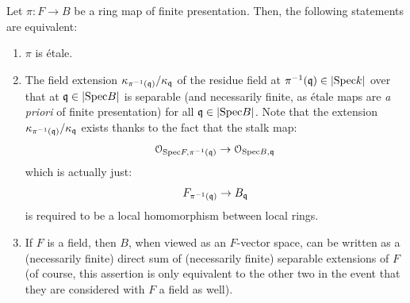             \begin{proposition} \label{prop: separable_criterion_for_etaleness} 
                Let $\pi: F \to B$ be a ring map of finite presentation. Then, the following statements are equivalent:
                    \begin{enumerate}
                        \item $\pi$ is \'etale.
                        \item The field extension $\kappa_{\pi^{-1}(\mathfrak{q})}/\kappa_{\mathfrak{q}}$ of the residue field at $\pi^{-1}(\mathfrak{q}) \in |\mathrm{Spec} k|$ over that at $\mathfrak{q} \in |\mathrm{Spec} B|$ is separable (and necessarily finite, as \'etale maps are \textit{a priori} of finite presentation) for all $\mathfrak{q} \in |\mathrm{Spec} B|$. Note that the extension $\kappa_{\pi^{-1}(\mathfrak{q})}/\kappa_{\mathfrak{q}}$ exists thanks to the fact that the stalk map:
                            $$\mathcal{O}_{\mathrm{Spec} F, \pi^{-1}(\mathfrak{q})} \to \mathcal{O}_{\mathrm{Spec} B, \mathfrak{q}}$$
                        which is actually just: 
                            $$F_{\pi^{-1}(\mathfrak{q})} \to B_{\mathfrak{q}}$$
                        is required to be a local homomorphism between local rings.
                        \item If $F$ is a field, then $B$, when viewed as an $F$-vector space, can be written as a (necessarily finite) direct sum of (necessarily finite) separable extensions of $F$ (of course, this assertion is only equivalent to the other two in the event that they are considered with $F$ a field as well).
                    \end{enumerate}
            \end{proposition}
